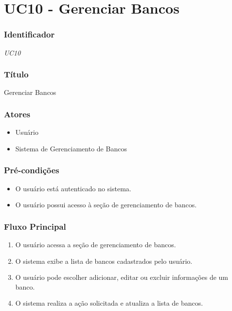 \chapter{UC10 - Gerenciar Bancos}
\label{apendiceUC10}

\subsection*{Identificador}
\textit{UC10}

\subsection*{Título}
Gerenciar Bancos

\subsection*{Atores}
\begin{addmargin}[1.5cm]{0cm}
    \begin{itemize}
        \item Usuário
        \item Sistema de Gerenciamento de Bancos
    \end{itemize}
\end{addmargin}

\subsection*{Pré-condições}
\begin{addmargin}[1.5cm]{0cm}
    \begin{itemize}
        \item O usuário está autenticado no sistema.
        \item O usuário possui acesso à seção de gerenciamento de bancos.
    \end{itemize}
\end{addmargin}

\subsection*{Fluxo Principal}
\begin{addmargin}[1.5cm]{0cm}
    \begin{enumerate}
        \item O usuário acessa a seção de gerenciamento de bancos.
        \item O sistema exibe a lista de bancos cadastrados pelo usuário.
        \item O usuário pode escolher adicionar, editar ou excluir informações de um banco.
        \item O sistema realiza a ação solicitada e atualiza a lista de bancos.
    \end{enumerate}
\end{addmargin}

